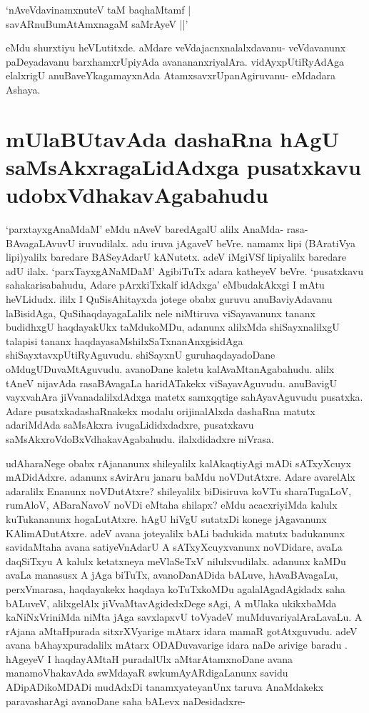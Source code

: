 \begin{shloka}
`nA\s veVdavinamxnuteV taM baqhaMtamf |\label{106}\\
savARnuBumAtAmxnagaM saMrAyeV ||'
\end{shloka}
eMdu shurxtiyu heVLutitxde. aMdare veVdajacnxnalalxdavanu- veVdavanunx paDeyadavanu barxhamxrUpiyAda avanananxriyalAra. vidAyxpUtiRyAdAga elalxrigU anuBaveYkagamayxnAda AtamxsavxrUpanAgiruvanu- eMdadara Ashaya.

\section*{mUlaBUtavAda dashaRna hAgU saMsAkxragaLidAdxga pusatxkavu udobxVdhakavAgabahudu}

`parxtayxgAnaMdaM' eMdu nAveV baredAgalU alilx AnaMda- rasa- BAvagaLAvuvU iruvudilalx. adu iruva jAgaveV beVre. namamx lipi (BAratiVya lipi)yalilx baredare BASeyAdarU kANutetx. adeV iMgiVSf lipiyalilx baredare adU ilalx. `parxTayxgANaMDaM' AgibiTuTx  adara katheyeV beVre. `pusatxkavu sahakarisabahudu, Adare pArxkiTxkalf idAdxga' eMbudakAkxgi I mAtu heVLidudx. ililx I QuSisAhitayxda jotege obabx guruvu anuBaviyAdavanu laBisidAga, QuSihaqdayagaLalilx nele niMtiruva viSayavanunx tananx budidhxgU haqdayakUkx taMdukoMDu, adanunx alilxMda shiSayxnalilxgU talapisi tananx haqdayasaMshilxSaTxnanAnxgisidAga shiSayxtavxpUtiRyAguvudu. shiSayxnU guruhaqdayadoDane oMdugUDuvaMtAguvudu. avanoDane kaletu kalAvaMtanAgabahudu. alilx tAneV nijavAda rasaBAvagaLa haridATakekx viSayavAguvudu. anuBavigU vayxvahAra jiVvanadalilxdAdxga matetx samxqqtige sahAyavAguvudu pusatxka. Adare pusatxkadashaRnakekx modalu orijinalAlxda dashaRna matutx adariMdAda saMsAkxra ivugaLididxdadxre, pusatxkavu saMsAkxroVdoBxVdhakavAgabahudu. ilalxdidadxre niVrasa.

udAharaNege obabx rAjananunx shileyalilx kalAkaqtiyAgi mADi sATxyXcuyx mADidAdxre. adanunx sAvirAru janaru baMdu noVDutAtxre. Adare avarelAlx adaralilx Enanunx noVDutAtxre? shileyalilx biDisiruva koVTu sharaTugaLoV, rumAloV, ABaraNavoV noVDi eMtaha shilapx? eMdu acacxriyiMda kalulx kuTukananunx hogaLutAtxre. hAgU hiVgU sutatxDi konege jAgavanunx KAlimADutAtxre. adeV avana joteyalilx bALi badukida matutx badukanunx savidaMtaha avana satiyeVnAdarU A sATxyXcuyxvanunx noVDidare, avaLa daqSiTxyu A kalulx ketatxneya meVlaSeTxV nilulxvudilalx. adanunx kaMDu avaLa manasusx A jAga biTuTx, avanoDanADida bALuve, hAvaBAvagaLu, perxVmarasa, haqdayakekx haqdaya koTuTxkoMDu agalalAgadAgidadx saha bALuveV, alilxgelAlx jiVvaMtavAgidedxDege sAgi, A mUlaka ukikxbaMda kaNiNxVriniMda niMta jAga savxlapxvU toVyadeV muMduvariyalAraLavaLu. A rAjana aMtaHpurada sitxrXVyarige mAtarx idara mamaR gotAtxguvudu. adeV avana bAhayxpuradalilx mAtarx ODADuvavarige idara naDe arivige baradu . hAgeyeV I haqdayAMtaH puradalUlx aMtarAtamxnoDane avana manamoVhakavAda swMdayaR swkumAyARdigaLanunx savidu ADipADikoMDADi mudAdxDi tanamxyateyanUnx taruva AnaMdakekx paravasharAgi avanoDane saha bALevx naDesidadxre-

